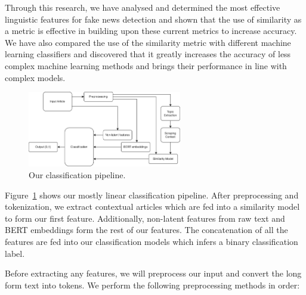 \documentclass{article}
\begin{document}
Through this research, we have analysed and determined the most effective linguistic features for fake news detection and shown that the use of similarity as a metric is effective in building upon these current metrics to increase accuracy. We have also compared the use of the similarity metric with different machine learning classifiers and discovered that it greatly increases the accuracy of less complex machine learning methods and brings their performance in line with complex models.




\begin{minipage}{\textwidth}
  \begin{figure}
    \vspace*{-20pt}
    \centering
    \includegraphics[width=0.6\textwidth]{img/pipeline.png}
    \caption{Our classification pipeline.}
    \label{pipeline}
  \end{figure}

  Figure~\ref{pipeline} shows our mostly linear classification pipeline. After preprocessing and tokenization, we extract contextual articles which are fed into a similarity model to form our first feature. Additionally, non-latent features from raw text and BERT embeddings form the rest of our features. The concatenation of all the features are fed into our classification models which infers a binary classification label.
\end{minipage}


Before extracting any features, we will preprocess our input and convert the long form text into tokens. We perform the following preprocessing methods in order:
\end{document}

